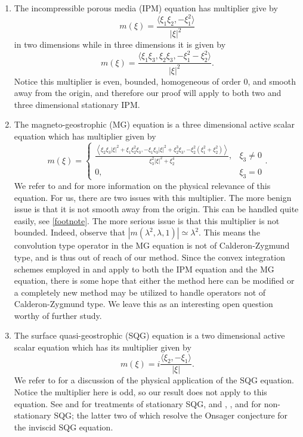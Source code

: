 \documentclass[12pt,reqno,letterpaper]{amsart}
\numberwithin{equation}{section}
\newcommand{\1}{{\bf 1}}
\newcommand{\2}{{\bf 2}}
\theoremstyle{remark}
\theoremstyle{remark}
\begin{document}
\begin{enumerate}
    \item [(a)] The incompressible porous media (IPM) equation has multiplier give by
    $$
    m(\xi) = \frac{\langle \xi_1 \xi_2, -\xi_1^2\rangle}{|\xi|^2}
    $$
    in two dimensions while in three dimensions it is given by
    $$
    m(\xi) = \frac{\langle \xi_1\xi_3, \xi_2\xi_3, -\xi_1^2 - \xi_2^2\rangle}{|\xi|^2}.
    $$
    Notice this multiplier is even, bounded, homogeneous of order $0$, and smooth away from the origin, and therefore our proof will apply to both two and three dimensional stationary IPM.
    \item [(b)] The magneto-geostrophic (MG) equation is a three dimensional active scalar equation which has multiplier given by
    $$
    m(\xi) = 
    \begin{cases}
        \frac{\left\langle \xi_2\xi_3|\xi|^2 + \xi_1\xi_2^2 \xi_3, -\xi_1\xi_3|\xi|^2 + \xi_2^3 \xi_3, -\xi_2^2(\xi_1^2 + \xi_2^2)\right\rangle}{\xi_3^2|\xi|^2 + \xi_2^4}, & \xi_3 \not=0\\
        0, & \xi_3 = 0
    \end{cases}.
    $$
    We refer to \cite{FRV} and \cite{LM} for more information on the physical relevance of this equation. For us, there are two issues with this multiplier. The more benign issue is that it is not smooth away from the origin. This can be handled quite easily, see \ref{footnote}. The more serious issue is that this multiplier is not bounded. Indeed, observe that $|m(\lambda^2,\lambda,1)| \simeq \lambda^2$. This means the convolution type operator in the MG equation is not of Calderon-Zygmund type, and is thus out of reach of our method. Since the convex integration schemes employed in \cite{IV} and \cite{Shvydkoy} apply to both the IPM equation and the MG equation, there is some hope that either the method here can be modified or a completely new method may be utilized to handle operators not of Calderon-Zygmund type. We leave this as an interesting open question worthy of further study.
    \item [(c)] The surface quasi-geostrophic (SQG) equation is a two dimensional active scalar equation which has its multiplier given by
    $$
    m(\xi) = i\frac{\langle \xi_2,-\xi_1\rangle}{|\xi|}.
    $$
    We refer to \cite{Salmon} for a discussion of the physical application of the SQG equation. Notice the multiplier here is odd, so our result does not apply to this equation. See \cite{CKL} and \cite{GR} for treatments of stationary SQG, and \cite{BSV}, \cite{DGR}, and \cite{IL} for non-stationary SQG; the latter two of which resolve the Onsager conjecture for the inviscid SQG equation.
\end{enumerate}
\end{document}
